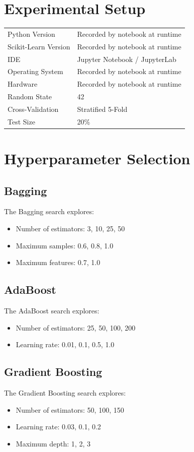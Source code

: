 \documentclass[12pt,a4paper]{article}
\begin{document}
\section{Experimental Setup}
\begin{tabular}{ll}
\toprule
Python Version & Recorded by notebook at runtime \\
Scikit-Learn Version & Recorded by notebook at runtime \\
IDE & Jupyter Notebook / JupyterLab \\
Operating System & Recorded by notebook at runtime \\
Hardware & Recorded by notebook at runtime \\
Random State & 42 \\
Cross-Validation & Stratified 5-Fold \\
Test Size & 20\% \\
\bottomrule
\end{tabular}

\section{Hyperparameter Selection}

\subsection{Bagging}
The Bagging search explores:
\begin{itemize}
\item Number of estimators: 3, 10, 25, 50
\item Maximum samples: 0.6, 0.8, 1.0
\item Maximum features: 0.7, 1.0
\end{itemize}

\subsection{AdaBoost}
The AdaBoost search explores:
\begin{itemize}
\item Number of estimators: 25, 50, 100, 200
\item Learning rate: 0.01, 0.1, 0.5, 1.0
\end{itemize}

\subsection{Gradient Boosting}
The Gradient Boosting search explores:
\begin{itemize}
\item Number of estimators: 50, 100, 150
\item Learning rate: 0.03, 0.1, 0.2
\item Maximum depth: 1, 2, 3
\end{itemize}
\end{document}
